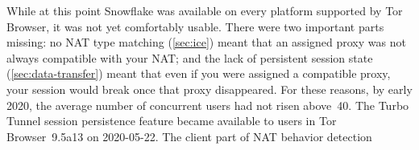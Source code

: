 \documentclass[letterpaper,twocolumn]{article}
\begin{document}
While at this point Snowflake was available
on every platform supported by Tor Browser,
it was not yet comfortably usable.
There were two important parts missing:
no NAT type matching (\autoref{sec:ice})
meant that an assigned proxy was not always compatible with your NAT;
and the lack of persistent session state (\autoref{sec:data-transfer})
meant that even if you were assigned a compatible proxy,
your session would break once that proxy disappeared.
For these reasons, by early 2020,
the average number of concurrent users
had not risen above~40.
%
%
The Turbo Tunnel session persistence feature
became available to users in Tor Browser~9.5a13
on \mbox{2020-05-22}.
The client part of NAT behavior detection
\end{document}
